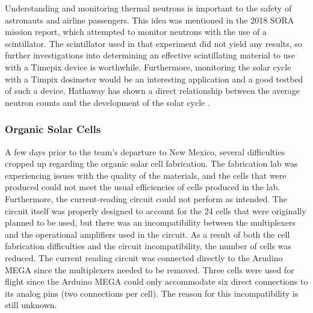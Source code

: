 Understanding and monitoring thermal neutrons is important to the safety of astronauts and airline passengers.
This idea was mentioned in the 2018 SORA mission report, which attempted to monitor neutrons with the use of a scintillator.
The scintillator used in that experiment did not yield any results, so further investigations into determining an effective scintillating material to use with a Timepix device is worthwhile.
Furthermore, monitoring the solar cycle with a Timpix dosimeter would be an interesting application and a good testbed of such a device.
Hathaway has shown a direct relationship between the average neutron counts and the development of the solar cycle \cite{Hathaway-Solar-Cycle}.



\subsubsection{Organic Solar Cells}

A few days prior to the team's departure to New Mexico, several difficulties cropped up regarding the organic solar cell fabrication.
The fabrication lab was experiencing issues with the quality of the materials, and the cells that were produced could not meet the usual efficiencies of cells produced in the lab.
Furthermore, the current-reading circuit could not perform as intended.
The circuit itself was properly designed to account for the 24 cells that were originally planned to be used, but there was an incompatibility between the multiplexers and the operational amplifiers used in the circuit.
As a result of both the cell fabrication difficulties and the circuit incompatibility, the number of cells was reduced.
The current reading circuit was connected directly to the Arudino MEGA since the multiplexers needed to be removed.
Three cells were used for flight since the Arduino MEGA could only accommodate six direct connections to its analog pins (two connections per cell).
The reason for this incompatibility is still unknown.
